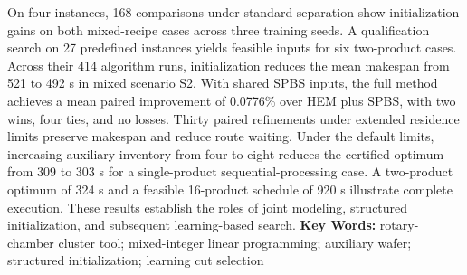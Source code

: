 On four instances, 168 comparisons under standard separation show initialization gains on both mixed-recipe cases across three training seeds. A qualification search on 27 predefined instances yields feasible inputs for six two-product cases. Across their 414 algorithm runs, initialization reduces the mean makespan from 521 to 492 s in mixed scenario S2. With shared SPBS inputs, the full method achieves a mean paired improvement of 0.0776\% over HEM plus SPBS, with two wins, four ties, and no losses. Thirty paired refinements under extended residence limits preserve makespan and reduce route waiting. Under the default limits, increasing auxiliary inventory from four to eight reduces the certified optimum from 309 to 303 s for a single-product sequential-processing case. A two-product optimum of 324 s and a feasible 16-product schedule of 920 s illustrate complete execution. These results establish the roles of joint modeling, structured initialization, and subsequent learning-based search.
\vfill
\noindent\textbf{Key Words: }rotary-chamber cluster tool; mixed-integer linear programming; auxiliary wafer; structured initialization; learning cut selection\clearpage
